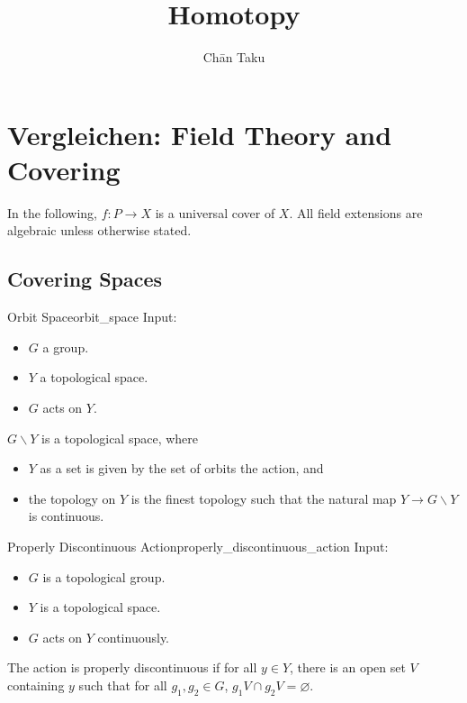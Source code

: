 \documentclass{article}
\title{Homotopy}
\author{Ch\=an Taku}
\begin{document}
\maketitle

% 
% 

\section{Vergleichen: Field Theory and Covering}

In the following, $f: P \rightarrow X$ is a universal cover of $X$.
All field extensions are algebraic unless otherwise stated.

\subsection{Covering Spaces}

\begin{definition}{Orbit Space}{orbit_space}
    Input:
    \begin{itemize}
        \item $G$ a group.
        \item $Y$ a topological space.
        \item $G$ acts on $Y$.
    \end{itemize}
    $G\backslash Y$ is a topological space, where
    \begin{itemize}
        \item $Y$ as a set is given by the set of orbits the action, and
        \item the topology on $Y$ is the finest topology such that the natural map $Y\rightarrow G\backslash Y$ is continuous.
    \end{itemize}
\end{definition}

\begin{definition}{Properly Discontinuous Action}{properly_discontinuous_action}
    Input:
    \begin{itemize}
        \item $G$ is a topological group.
        \item $Y$ is a topological space.
        \item $G$ acts on $Y$ continuously.
    \end{itemize}
    The action is properly discontinuous if for all $y\in Y$, there is an open set $V$ containing $y$ such that for all $g_1,g_2\in G$, $g_1 V \cap g_2 V = \varnothing$.
\end{definition}
\end{document}
